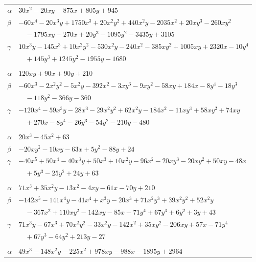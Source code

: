 \documentclass[11pt]{article}
\begin{document}
\begin{longtable}{@{}ll@{}}
$\alpha$ & $30x^{2}-20xy-875x+805y+945$\\
$\beta$ & $-60x^{4}-20x^{3}y+1750x^{3}+20x^{2}y^{2}+440x^{2}y-2035x^{2}+20xy^{3}-260xy^{2}$\\
 & $\quad -1795xy-270x+20y^{3}-1095y^{2}-3435y+3105$\\
$\gamma$ & $10x^{3}y-145x^{3}+10x^{2}y^{2}-530x^{2}y-240x^{2}-385xy^{2}+1005xy+2320x-10y^{4}$\\
 & $\quad +145y^{3}+1245y^{2}-1955y-1680$\\
\addlinespace[3pt]
\multicolumn{2}{@{}l}{$\{i,j\}=\{10,104\}$, $k_{ij}=2\cdot 3^{2}\cdot 5\cdot 7$}\\
$\alpha$ & $120xy+90x+90y+210$\\
$\beta$ & $-60x^{3}-2x^{2}y^{2}-5x^{2}y-392x^{2}-3xy^{3}-9xy^{2}-58xy+184x-8y^{4}-18y^{3}$\\
 & $\quad -118y^{2}-366y-360$\\
$\gamma$ & $-120x^{4}-59x^{3}y-28x^{3}-29x^{2}y^{2}+62x^{2}y-184x^{2}-11xy^{3}+58xy^{2}+74xy$\\
 & $\quad +270x-8y^{4}-26y^{3}-54y^{2}-210y-480$\\
\addlinespace[3pt]
\multicolumn{2}{@{}l}{$\{i,j\}=\{10,105\}$, $k_{ij}=3^{3}\cdot 7$}\\
$\alpha$ & $20x^{3}-45x^{2}+63$\\
$\beta$ & $-20xy^{2}-10xy-63x+5y^{2}-88y+24$\\
$\gamma$ & $-40x^{5}+50x^{4}-40x^{3}y+50x^{3}+10x^{2}y-96x^{2}-20xy^{3}-20xy^{2}+50xy-48x$\\
 & $\quad +5y^{3}-25y^{2}+24y+63$\\
\addlinespace[3pt]
\multicolumn{2}{@{}l}{$\{i,j\}=\{10,106\}$, $k_{ij}=2\cdot 3^{2}\cdot 5\cdot 7$}\\
$\alpha$ & $71x^{3}+35x^{2}y-13x^{2}-4xy-61x-70y+210$\\
$\beta$ & $-142x^{5}-141x^{4}y-41x^{4}+x^{3}y-20x^{3}+71x^{2}y^{3}+39x^{2}y^{2}+52x^{2}y$\\
 & $\quad -367x^{2}+110xy^{2}-142xy-85x-71y^{4}+67y^{3}+6y^{2}+3y+43$\\
$\gamma$ & $71x^{3}y-67x^{3}+70x^{2}y^{2}-33x^{2}y-142x^{2}+35xy^{2}-206xy+57x-71y^{4}$\\
 & $\quad +67y^{3}-64y^{2}+213y-27$\\
\addlinespace[3pt]
\multicolumn{2}{@{}l}{$\{i,j\}=\{10,108\}$, $k_{ij}=2^{2}\cdot 3^{2}\cdot 13\cdot 19$}\\
$\alpha$ & $49x^{3}-148x^{2}y-225x^{2}+978xy-988x-1895y+2964$\\

\end{longtable}
\end{document}
